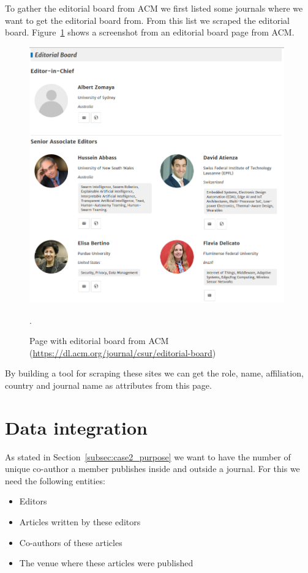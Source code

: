 \documentclass{ou-report}
\begin{document}
To gather the editorial board from ACM we first listed some journals where 
we want to get the editorial board from. From this list we scraped the 
editorial board. Figure~\ref{fig:acm_editorial_board} shows a screenshot 
from an editorial board page from ACM.

\begin{figure}[H]
\centering
\includegraphics[width=11cm]{images/acm_editorial_board.png}
\caption{Page with editorial board from ACM (\url{https://dl.acm.org/journal/csur/editorial-board})}.
\label{fig:acm_editorial_board}
\end{figure}

By building a tool for scraping these sites we can get the role, name, 
affiliation, country and journal name as attributes from this page.

\section{Data integration}
As stated in Section~\ref{subsec:case2_purpose} we want to have the number of
unique co-author a member publishes inside and outside a journal. For this we
need the following entities:
\begin{itemize}
    \item Editors
    \item Articles written by these editors
    \item Co-authors of these articles
    \item The venue where these articles were published
\end{itemize}
\end{document}
